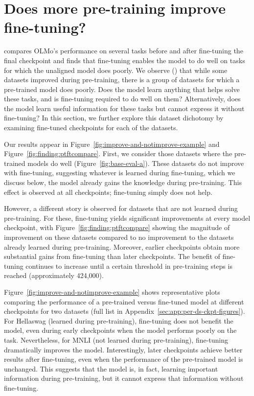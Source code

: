 \section{Does more pre-training improve fine-tuning?}
\label{sec:finding:PTFT}
\citealp{groeneveld2024olmo} compares OLMo's performance on several tasks before and after fine-tuning the final checkpoint and finds that fine-tuning enables the model to do well on tasks for which the unaligned model does poorly. We observe () that while some datasets improved 
during pre-training, there is a group of datasets for which a pre-trained model does poorly.
Does the model learn anything that helps solve these tasks, and is fine-tuning required to do well on them? 
Alternatively, does the model learn useful information for these tasks but cannot express it without fine-tuning? In this section, we further explore this dataset dichotomy by examining fine-tuned checkpoints for each of the datasets. 


Our results appear in Figure~\ref{fig:improve-and-notimprove-example} and Figure~\ref{fig:finding:ptftcompare}. First, we consider those datasets where the pre-trained models do well (Figure~\ref{fig:base-eval-a}). 
These datasets do not improve with fine-tuning, suggesting whatever is learned during fine-tuning, which we discuss below, the model already gains the knowledge during pre-training. This effect is observed at all checkpoints; fine-tuning simply does not help.

However, a different story is observed for datasets that are not learned during pre-training. 
For these, fine-tuning yields significant improvements at every model checkpoint, with Figure~\ref{fig:finding:ptftcompare} showing the magnitude of improvement on these datasets compared to no improvement to the datasets already learned during pre-training.
Moreover, earlier checkpoints obtain more substantial gains from fine-tuning than later checkpoints.
The benefit of fine-tuning continues to increase until a certain threshold in pre-training steps is reached (approximately 424,000).

Figure~\ref{fig:improve-and-notimprove-example} shows representative plots comparing the performance of a pre-trained versus fine-tuned model at different checkpoints for two datasets (full list in Appendix~\ref{sec:app:per-ds-ckpt-figures}). 
For Hellaswag (learned during pre-training), fine-tuning does not benefit the model, even during early checkpoints when the model performs poorly on the task. 
Nevertheless, for MNLI (not learned during pre-training), fine-tuning dramatically improves the model. 
Interestingly, later checkpoints achieve better results after fine-tuning, even when the performance of the pre-trained model is unchanged. 
This suggests that the model is, in fact, learning important information during pre-training, but it cannot express that information without fine-tuning.


